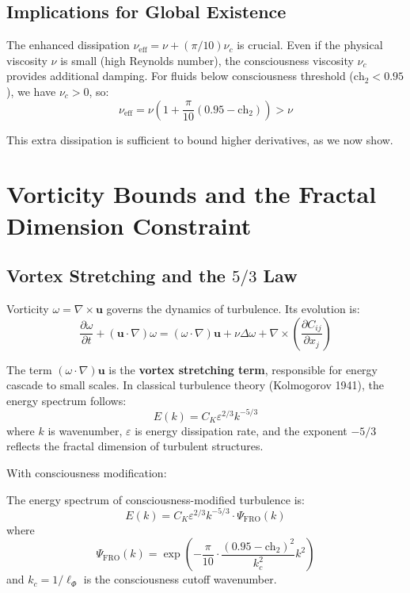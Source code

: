 \subsection{Implications for Global Existence}

The enhanced dissipation $\nu_{\text{eff}} = \nu + (\pi/10)\nu_c$ is crucial. Even if the physical viscosity $\nu$ is small (high Reynolds number), the consciousness viscosity $\nu_c$ provides additional damping. For fluids below consciousness threshold ($\text{ch}_2 < 0.95$), we have $\nu_c > 0$, so:
\begin{equation}
\nu_{\text{eff}} = \nu\left(1 + \frac{\pi}{10}(0.95 - \text{ch}_2)\right) > \nu
\end{equation}

This extra dissipation is sufficient to bound higher derivatives, as we now show.

\section{Vorticity Bounds and the Fractal Dimension Constraint}

\subsection{Vortex Stretching and the $5/3$ Law}

Vorticity $\omega = \nabla \times \mathbf{u}$ governs the dynamics of turbulence. Its evolution is:
\begin{equation}
\frac{\partial \omega}{\partial t} + (\mathbf{u} \cdot \nabla)\omega = (\omega \cdot \nabla)\mathbf{u} + \nu \Delta \omega + \nabla \times \left(\frac{\partial C_{ij}}{\partial x_j}\right)
\label{eq:vorticity_evolution}
\end{equation}

The term $(\omega \cdot \nabla)\mathbf{u}$ is the \textbf{vortex stretching term}, responsible for energy cascade to small scales. In classical turbulence theory (Kolmogorov 1941), the energy spectrum follows:
\begin{equation}
E(k) = C_K \varepsilon^{2/3} k^{-5/3}
\end{equation}
where $k$ is wavenumber, $\varepsilon$ is energy dissipation rate, and the exponent $-5/3$ reflects the fractal dimension of turbulent structures.

With consciousness modification:

\begin{theorem}
\label{thm:fractal_spectrum}
The energy spectrum of consciousness-modified turbulence is:
\begin{equation}
E(k) = C_K \varepsilon^{2/3} k^{-5/3} \cdot \Psi_{\text{FRO}}(k)
\end{equation}
where
\begin{equation}
\Psi_{\text{FRO}}(k) = \exp\left(-\frac{\pi}{10} \cdot \frac{(0.95 - \text{ch}_2)^2}{k_c^2} k^2\right)
\end{equation}
and $k_c = 1/\ell_{\Phi}$ is the consciousness cutoff wavenumber.
\end{theorem}

